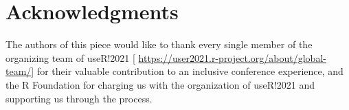 \documentclass[10pt,letterpaper]{article}
\begin{document}
\section*{Acknowledgments}
The authors of this piece would like to thank every single member of the organizing team of useR!2021 [ \url{https://user2021.r-project.org/about/global-team/}] for their valuable contribution to an inclusive conference experience, and the R Foundation for charging us with the organization of useR!2021 and supporting us through the process. 








\end{document}
